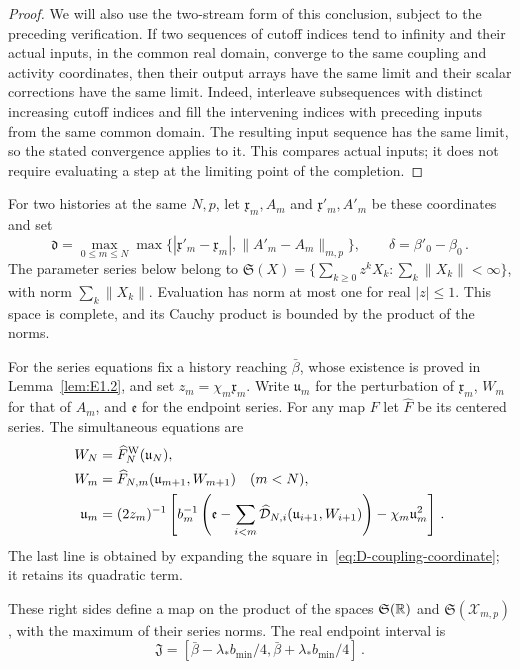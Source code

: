 \begin{proof}
We will also use the two-stream form of this conclusion, subject to the preceding verification. If two sequences of cutoff indices tend to infinity and their actual inputs, in the common real domain, converge to the same coupling and activity coordinates, then their output arrays have the same limit and their scalar corrections have the same limit. Indeed, interleave subsequences with distinct increasing cutoff indices and fill the intervening indices with preceding inputs from the same common domain. The resulting input sequence has the same limit, so the stated convergence applies to it. This compares actual inputs; it does not require evaluating a step at the limiting point of the completion.
\end{proof}

For two histories at the same $N,p$, let $\mathfrak x_m,A_m$ and $\mathfrak x'_m,A'_m$ be these coordinates and set
\begin{equation}\label{eq:D-history-distance}
\mathfrak d=\max_{0\le m\le N}\max\{|\mathfrak x'_m-\mathfrak x_m|,\|A'_m-A_m\|_{m,p}\},
\qquad \delta=\beta'_0-\beta_0\,.
\end{equation}
The parameter series below belong to $\mathfrak S(X)=\{\sum_{k\ge0}z^kX_k:\sum_k\|X_k\|<\infty\}$, with norm $\sum_k\|X_k\|$. Evaluation has norm at most one for real $|z|\le1$. This space is complete, and its Cauchy product is bounded by the product of the norms.

For the series equations fix a history reaching $\bar\beta$, whose existence is proved in Lemma~\ref{lem:E1.2}, and set $z_m=\chi_m\mathfrak x_m$. Write $\mathfrak u_m$ for the perturbation of $\mathfrak x_m$, $W_m$ for that of $A_m$, and $\mathfrak e$ for the endpoint series. For any map $F$ let $\widehat F$ be its centered series. The simultaneous equations are
\begin{align}\label{eq:D-series-map}
W_N&=\widehat F_N^{\rm W}(\mathfrak u_N),\notag\\
W_m&=\widehat F_{N,m}(\mathfrak u_{m+1},W_{m+1})\quad(m<N),\notag\\
\mathfrak u_m&=(2z_m)^{-1}\left[b_m^{-1}
\left(\mathfrak e-\sum_{i<m}\widehat{\mathcal D}_{N,i}(\mathfrak u_{i+1},W_{i+1})\right)-\chi_m \mathfrak u_m^2\right]\,.
\end{align}
The last line is obtained by expanding the square in~\eqref{eq:D-coupling-coordinate}; it retains its quadratic term.

These right sides define a map on the product of the spaces $\mathfrak S(\mathbb{R})$ and $\mathfrak S(\mathcal X_{m,p})$, with the maximum of their series norms. The real endpoint interval is
\begin{equation*}
\mathfrak J=[\bar\beta-\lambda_*b_{\min}/4,\bar\beta+\lambda_*b_{\min}/4]\,.
\end{equation*}


